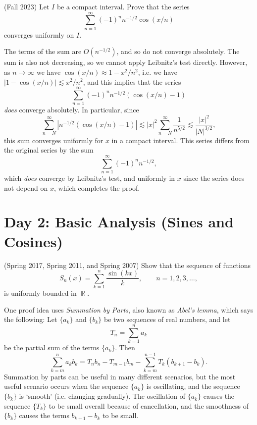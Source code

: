 \documentclass[answers]{exam}
\DeclareMathOperator{\RR}{\mathbb{R}}
\begin{document}
\begin{questions}
\question (Fall 2023) Let $I$ be a compact interval. Prove that the series
\[ \sum_{n = 1}^\infty (-1)^n n^{-1/2} \cos(x/n) \]
converges uniformly on $I$.
\begin{solution}
The terms of the sum are $O(n^{-1/2})$, and so do not converge absolutely. The sum is also not decreasing, so we cannot apply Leibnitz's test directly. However, as $n \to \infty$ we have $\cos(x/n) \approx 1 - x^2/n^2$, i.e. we have $|1 - \cos(x/n)| \lesssim x^2/n^2$, and this implies that the series
\[ \sum_{n = 1}^\infty (-1)^n n^{-1/2} ( \cos(x/n) - 1 ) \]
\emph{does} converge absolutely. In particular, since
\[ \sum_{n = N}^\infty |n^{-1/2} ( \cos(x/n) - 1 )| \lesssim |x|^2 \sum_{n = N}^\infty \frac{1}{n^{5/2}} \lesssim \frac{|x|^2}{|N|^{3/2}}, \]
this sum converges uniformly for $x$ in a compact interval. This series differs from the original series by the sum
\[ \sum_{n = 1}^\infty (-1)^n n^{-1/2}, \]
which \emph{does} converge by Leibnitz's test, and uniformly in $x$ since the series does not depend on $x$, which completes the proof.
\end{solution}

\newpage
\section{Day 2: Basic Analysis (Sines and Cosines)}

\question (Spring 2017, Spring 2011, and Spring 2007)
Show that the sequence of functions
  \begin{equation*}
    S_n(x)= \sum_{k=1}^{n}\frac{\sin(kx)}{k}, \quad \quad n=1,2,3,\ldots,
  \end{equation*}
  is uniformly bounded in $\RR$.

\begin{solution}
One proof idea uses \emph{Summation by Parts}, also known as \emph{Abel's lemma}, which says the following: Let $\{ a_k \}$ and $\{ b_k \}$ be two sequences of real numbers, and let
%
\[ T_n = \sum_{k = 1}^n a_k \]
%
be the partial sum of the terms $\{ a_k \}$. Then
%
\[ \sum_{k = m}^n a_k b_k = T_n b_n - T_{m-1} b_m - \sum_{k = m}^{n-1} T_k (b_{k+1} - b_k). \]
%
Summation by parts can be useful in many different scenarios, but the most useful scenario occurs when the sequence $\{ a_k \}$ is oscillating, and the sequence $\{ b_k \}$ is `smooth' (i.e. changing gradually). The oscillation of $\{ a_k \}$ causes the sequence $\{ T_k \}$ to be small overall because of cancellation, and the smoothness of $\{ b_k \}$ causes the terms $b_{k+1} - b_k$ to be small.


\end{solution}
\end{questions}
\end{document}
